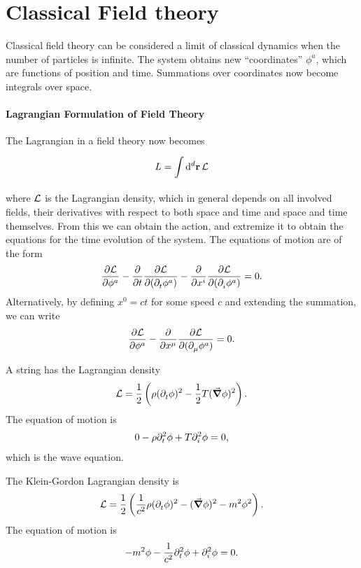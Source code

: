 \section{Classical Field theory}

Classical field theory can be considered a limit of classical dynamics when the number of particles is infinite. The system obtains new ``coordinates'' $\phi^{a}$, which are functions of position and time. Summations over coordinates now become integrals over space.

\paragraph{Lagrangian Formulation of Field Theory}
The Lagrangian in a field theory now becomes
\begin{align*}
	L = \integ[d]{}{}{\vb{r}}{\lag}
\end{align*}
where $\lag$ is the Lagrangian density, which in general depends on all involved fields, their derivatives with respect to both space and time and space and time themselves. From this we can obtain the action, and extremize it to obtain the equations for the time evolution of the system. The equations of motion are of the form
\begin{align*}
	\pdv{\lag}{\phi^{a}} - \pdv{t}\pdv{\lag}{(\del{t}{\phi^{a}})} - \pdv{x^{i}}\pdv{\lag}{(\del{i}{\phi^{a}})} = 0.
\end{align*}
Alternatively, by defining $x^{0} = ct$ for some speed $c$ and extending the summation, we can write
\begin{align*}
	\pdv{\lag}{\phi^{a}} - \pdv{x^{\mu}}\pdv{\lag}{(\del{\mu}{\phi^{a}})} = 0.
\end{align*}

A string has the Lagrangian density
\begin{align*}
	\lag = \frac{1}{2}\left(\rho(\del{t}{\phi})^{2} - \frac{1}{2}T(\grad{\phi})^{2}\right).
\end{align*}
The equation of motion is
\begin{align*}
	0 - \rho\del[2]{t}{\phi} + T\del[2]{i}{\phi} = 0,
\end{align*}
which is the wave equation.

The Klein-Gordon Lagrangian density is
\begin{align*}
	\lag = \frac{1}{2}\left(\frac{1}{c^{2}}\rho(\del{t}{\phi})^{2} - (\grad{\phi})^{2} - m^{2}\phi^{2}\right).
\end{align*}
The equation of motion is
\begin{align*}
	-m^{2}\phi - \frac{1}{c^{2}}\del[2]{t}{\phi} + \del[2]{i}{\phi} = 0.
\end{align*}


